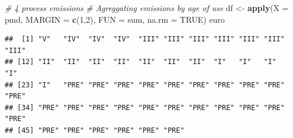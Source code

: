 \documentclass[12pt,graybox,envcountchap,sectrefs]{krantz}
\makeatletter
\newenvironment{Shaded}{\begin{snugshade}}{\end{snugshade}}
\newcommand{\KeywordTok}[1]{\textcolor[rgb]{0.13,0.29,0.53}{\textbf{#1}}}
\newcommand{\DataTypeTok}[1]{\textcolor[rgb]{0.13,0.29,0.53}{#1}}
\newcommand{\DecValTok}[1]{\textcolor[rgb]{0.00,0.00,0.81}{#1}}
\newcommand{\StringTok}[1]{\textcolor[rgb]{0.31,0.60,0.02}{#1}}
\newcommand{\CommentTok}[1]{\textcolor[rgb]{0.56,0.35,0.01}{\textit{#1}}}
\newcommand{\OtherTok}[1]{\textcolor[rgb]{0.56,0.35,0.01}{#1}}
\newcommand{\NormalTok}[1]{#1}
\newenvironment{kframe}{%
\medskip{}
\setlength{\fboxsep}{.8em}
 \def\at@end@of@kframe{}%
 \ifinner\ifhmode%
  \def\at@end@of@kframe{\end{minipage}}%
  \begin{minipage}{\columnwidth}%
 \fi\fi%
 \def\FrameCommand##1{\hskip\@totalleftmargin \hskip-\fboxsep
 \colorbox{shadecolor}{##1}\hskip-\fboxsep
     \hskip-\linewidth \hskip-\@totalleftmargin \hskip\columnwidth}%
 \MakeFramed {\advance\hsize-\width
   \@totalleftmargin\z@ \linewidth\hsize
   \@setminipage}}%
 {\par\unskip\endMakeFramed%
 \at@end@of@kframe}
\renewenvironment{Shaded}{\begin{kframe}}{\end{kframe}}
\theoremstyle{definition}
\theoremstyle{definition}
\theoremstyle{definition}
\theoremstyle{remark}
\makeatother
\begin{document}
\begin{Shaded}
\begin{Highlighting}[]
\CommentTok{# 4 process emissions}
\CommentTok{# Agreggating emissions by age of use}
\NormalTok{df <-}\StringTok{ }\KeywordTok{apply}\NormalTok{(}\DataTypeTok{X =}\NormalTok{ pmd, }\DataTypeTok{MARGIN =} \KeywordTok{c}\NormalTok{(}\DecValTok{1}\NormalTok{,}\DecValTok{2}\NormalTok{), }\DataTypeTok{FUN =}\NormalTok{ sum, }\DataTypeTok{na.rm =} \OtherTok{TRUE}\NormalTok{)}
\NormalTok{euro}
\end{Highlighting}
\end{Shaded}

\begin{verbatim}
##  [1] "V"   "IV"  "IV"  "IV"  "III" "III" "III" "III" "III" "III" "III"
## [12] "II"  "II"  "II"  "II"  "II"  "II"  "II"  "I"   "I"   "I"   "I"  
## [23] "I"   "PRE" "PRE" "PRE" "PRE" "PRE" "PRE" "PRE" "PRE" "PRE" "PRE"
## [34] "PRE" "PRE" "PRE" "PRE" "PRE" "PRE" "PRE" "PRE" "PRE" "PRE" "PRE"
## [45] "PRE" "PRE" "PRE" "PRE" "PRE" "PRE"
\end{verbatim}
\end{document}
